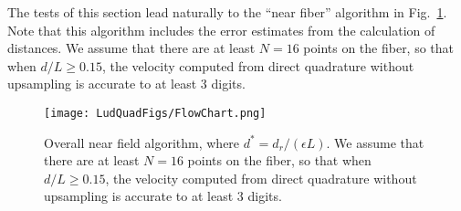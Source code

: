 The tests of this section lead naturally to the ``near fiber'' algorithm in Fig.\ \ref{fig:algflow}. Note that this algorithm includes the error estimates from the calculation of distances. We assume that there are at least $N=16$ points on the fiber, so that when $d/L \geq 0.15$, the velocity computed from direct quadrature without upsampling is accurate to at least 3 digits. 

\begin{figure}[ht]
\centering
\texttt{[image: LudQuadFigs/FlowChart.png]}
\caption{Overall near field algorithm, where $d^*=d_r/(\epsilon L)$. We assume that there are at least $N=16$ points on the fiber, so that when $d/L \geq 0.15$, the velocity computed from direct quadrature without upsampling is accurate to at least 3 digits. }
\label{fig:algflow}
\end{figure}